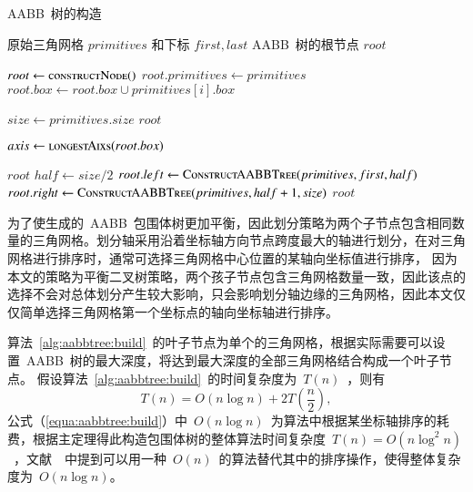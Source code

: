 \begin{algorithm}[htbp]
\small
\caption{AABB~树的构造}
\label{alg:aabbtree:build}
\begin{algorithmic}[1]
\Require
原始三角网格 $primitives$ 和下标 $first, last$
\Ensure
AABB~树的根节点 $root$

  \State $root \gets \Call{constructNode()}{}$ 
  \State $root.primitives \gets primitives$
      \State $root.box \gets root.box \cup primitives[i].box$
  \EndFor

  \State $size \gets primitives.size$  
  \State \Return $root$
  \EndIf

  \State $axis \gets \Call{longestAixs}{root.box}$
  
      \State \Return $root$
  \EndIf
  \State $half \gets size / 2 $
  \State $root.left \gets \Call{ConstructAABBTree}{primitives, first, half}$
  \State {}
  \State $root.right \gets \Call{ConstructAABBTree}{primitives, half+1, size}$ 
  \State \Return $root$
\EndFunction
\end{algorithmic}
\end{algorithm}

为了使生成的~AABB~包围体树更加平衡，因此划分策略为两个子节点包含相同数量的三角网格。划分轴采用沿着坐标轴方向节点跨度最大的轴进行划分，在对三角网格进行排序时，通常可选择三角网格中心位置的某轴向坐标值进行排序，
因为本文的策略为平衡二叉树策略，两个孩子节点包含三角网格数量一致，因此该点的选择不会对总体划分产生较大影响，只会影响划分轴边缘的三角网格，因此本文仅仅简单选择三角网格第一个坐标点的轴向坐标轴进行排序。

算法~\ref{alg:aabbtree:build}~的叶子节点为单个的三角网格，根据实际需要可以设置~AABB~树的最大深度，将达到最大深度的全部三角网格结合构成一个叶子节点。
假设算法~\ref{alg:aabbtree:build}~的时间复杂度为~$T(n)$~，则有
\begin{equation}
  T(n) = O(n \log n ) + 2T(\frac{n}{2}),
\label{equa:aabbtree:build}
\end{equation}
公式（\ref{equa:aabbtree:build}）中~$O(n \log n)$~为算法中根据某坐标轴排序的耗费，根据主定理得此构造包围体树的整体算法时间复杂度~$T(n)=O(n\log^2n)$~，文献~~中提到可以用一种~$O(n)$~的算法替代其中的排序操作，使得整体复杂度为~$O(n\log n)$。

